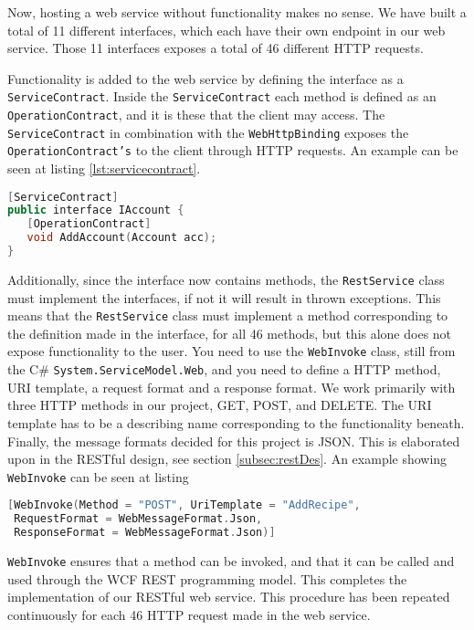 Now, hosting a web service without functionality makes no sense. We have built a total of 11 different interfaces, which each have their own endpoint in our web service. Those 11 interfaces exposes a total of 46 different HTTP requests. 

Functionality is added to the web service by defining the interface as a \texttt{ServiceContract}\cite{ServiceContract}. Inside the \texttt{ServiceContract} each method is defined as an \texttt{OperationContract}\cite{OperationContract}, and it is these that the client may access. The \texttt{ServiceContract} in combination with the \texttt{WebHttpBinding} exposes the \texttt{OperationContract's} to the client through HTTP requests. An example can be seen at listing \ref{lst:servicecontract}.

\begin{lstlisting}[language=c++, label={lst:servicecontract}, caption=Definition of a ServiceContract]
[ServiceContract]
public interface IAccount {
   [OperationContract]
   void AddAccount(Account acc);
}
\end{lstlisting}

Additionally, since the interface now contains methods, the \texttt{RestService} class must implement the interfaces, if not it will result in thrown exceptions. This means that the \texttt{RestService} class must implement a method corresponding to the definition made in the interface, for all 46 methods, but this alone does not expose functionality to the user. You need to use the \texttt{WebInvoke}\cite{WebInvoke} class, still from the C\# \texttt{System.ServiceModel.Web}, and you need to define a HTTP method, URI template, a request format and a response format. We work primarily with three HTTP methods in our project, GET, POST, and DELETE. The URI template has to be a describing name corresponding to the functionality beneath. Finally, the message formats decided for this project is JSON. This is elaborated upon in the RESTful design, see section \ref{subsec:restDes}. An example showing \texttt{WebInvoke} can be seen at listing 

\begin{lstlisting}[language=c++, label={lst:webinvoke}, caption=Definition of a WebInvoke]
[WebInvoke(Method = "POST", UriTemplate = "AddRecipe", 
 RequestFormat = WebMessageFormat.Json, 
 ResponseFormat = WebMessageFormat.Json)]
\end{lstlisting}

\texttt{WebInvoke} ensures that a method can be invoked, and that it can be called and used through the WCF REST programming model. This completes the implementation of our RESTful web service. This procedure has been repeated continuously for each 46 HTTP request made in the web service.